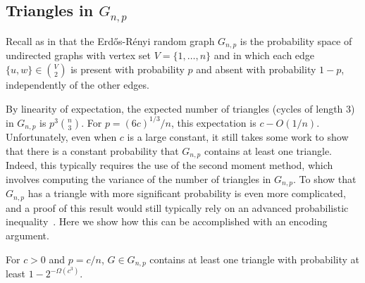 \documentclass[prodmode,acmcsur]{acmsmall}
\begin{document}
\subsection{Triangles in $G_{n,p}$}

Recall as in  that the Erd\H{o}s-R\'{e}nyi random graph
$G_{n,p}$ is the probability space of undirected graphs with vertex set
$V=\{1,\ldots,n\}$ and in which each edge $\{u, w\} \in \binom{V}{2}$
is present with probability $p$ and absent with probability $1-p$,
independently of the other edges.

By linearity of expectation, the expected number of triangles (cycles of length 3) 
in $G_{n,p}$ is $p^3\binom{n}{3}$.  For $p=(6c)^{1/3}/n$, this
expectation is $c-O(1/n)$.  Unfortunately, even when $c$ is a large
constant, it still takes some work to show that there is a constant
probability that $G_{n,p}$ contains at least one triangle. Indeed,
this typically requires the use of the second moment method, which
involves computing the variance of the number of triangles in
$G_{n,p}$. To show that $G_{n, p}$ has a triangle with more
significant probability is even more complicated,
 and a proof of this result would still typically rely on an
advanced probabilistic inequality~\cite{alon:probabilistic}. Here we
show how this can be accomplished with an encoding argument.

\begin{thm}
  For $c > 0$ and $p=c/n$, $G \in G_{n,p}$ contains at least one triangle with
  probability at least $1-2^{-\varOmega(c^3)}$.
\end{thm}
\end{document}
